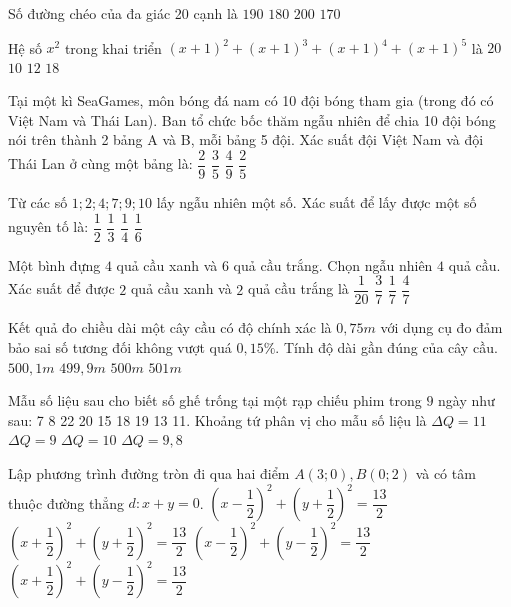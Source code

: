 \begin{ex}
Số đường chéo của đa giác 20 cạnh là 
\choice
{$190$}
{$180$}
{$200$}
{$170$}
\end{ex}
\begin{ex}
Hệ số $x^2$ trong khai triển ${{(x+1)}^2}+{{(x+1)}^3}+{{(x+1)}^4}+{{(x+1)}^5}$ là 
\choice
{$20$}
{$10$}
{$12$}
{$18$}
\end{ex}
\begin{ex}
Tại một kì SeaGames, môn bóng đá nam có 10 đội bóng tham gia (trong đó có Việt Nam và Thái Lan). Ban tổ chức bốc thăm ngẫu nhiên để chia 10 đội bóng nói trên thành 2 bảng A và B, mỗi bảng 5 đội. Xác suất đội Việt Nam và đội Thái Lan ở cùng một bảng là:
\choice
{$\dfrac{2}{9}$}
{$\dfrac{3}{5}$}
{$\dfrac{4}{9}$}
{$\dfrac{2}{5}$}
\end{ex}
\begin{ex}
Từ các số $1;2;4;7;9;10$ lấy ngẫu nhiên một số. Xác suất để lấy được một số nguyên tố là:
\choice
{$\dfrac{1}{2}$}
{$\dfrac{1}{3}$}
{$\dfrac{1}{4}$}
{$\dfrac{1}{6}$}
\end{ex}
\begin{ex}
Một bình đựng $4$ quả cầu xanh và $6$ quả cầu trắng. Chọn ngẫu nhiên $4$ quả cầu. Xác suất để được $2$ quả cầu xanh và $2$ quả cầu trắng là
\choice
{$\dfrac{1}{20}$}
{$\dfrac{3}{7}$}
{$\dfrac{1}{7}$}
{$\dfrac{4}{7}$}
\end{ex}
\begin{ex}
Kết quả đo chiều dài một cây cầu có độ chính xác là $0{,}75m$ với dụng cụ đo đảm bảo sai số tương đối không vượt quá $0{,}15\%$. Tính độ dài gần đúng của cây cầu.
\choice
{$500{,}1m$}
{$499{,}9m$}
{$500m$}
{$501m$}
\end{ex}
\begin{ex}
Mẫu số liệu sau cho biết số ghế trống tại một rạp chiếu phim trong $9$ ngày như sau: 7 8 22 20 15 18 19 13 11. Khoảng tứ phân vị cho mẫu số liệu là
\choice
{$\Delta Q=11$}
{$\Delta Q=9$}
{$\Delta Q=10$}
{$\Delta Q=9{,}8$}
\end{ex}
\begin{ex}
	Lập phương trình đường tròn đi qua hai điểm $A(3;0),B(0;2)$ và có tâm thuộc đường thẳng $d\colon x+y=0$.
	\choice
	{$\left(x-\dfrac{1}{2}\right)^2+{{\left(y+\dfrac{1}{2}\right)}^2}=\dfrac{13}{2}$}
	{${{\left(x+\dfrac{1}{2}\right)}^2}+{{\left(y+\dfrac{1}{2}\right)}^2}=\dfrac{13}{2}$}
	{${{\left(x-\dfrac{1}{2}\right)}^2}+{{\left(y-\dfrac{1}{2}\right)}^2}=\dfrac{13}{2}$}
	{${{\left(x+\dfrac{1}{2}\right)}^2}+{{\left(y-\dfrac{1}{2}\right)}^2}=\dfrac{13}{2}$}
\end{ex}



